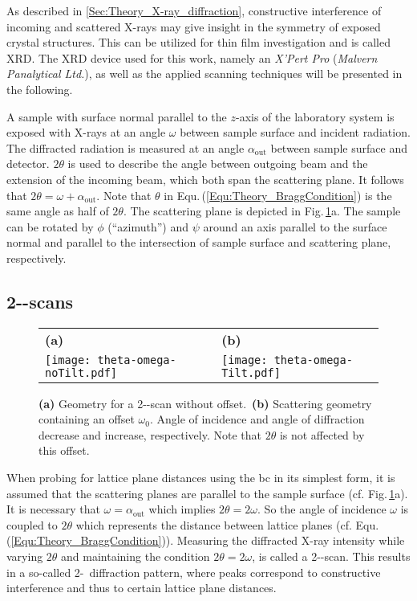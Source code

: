 As described in \ref{Sec:Theory_X-ray_diffraction}, constructive interference of incoming and scattered X-rays may give insight in the symmetry of exposed crystal structures.
This can be utilized for thin film investigation and is called \gls{XRD}.
The \gls{XRD} device used for this work, namely an \textit{X'Pert Pro} (\textit{Malvern Panalytical Ltd.}), as well as the applied scanning techniques will be presented in the following.

A sample with surface normal parallel to the $z$-axis of the laboratory system is exposed with X-rays at an angle $\omega$ between sample surface and incident radiation.
The diffracted radiation is measured at an angle $\alpha_\mathrm{out}$ between sample surface and detector.
$2\theta$ is used to describe the angle between outgoing beam and the extension of the incoming beam, which both span the scattering plane.
It follows that $2\theta=\omega+\alpha_\mathrm{out}$.
Note that $\theta$ in Equ.\,(\ref{Equ:Theory_BraggCondition}) is the same angle as half of $2\theta$.
The scattering plane is depicted in Fig.\,\ref{Fig:Methods_XRD_geometry}a.
The sample can be rotated by $\phi$ (\enquote{azimuth}) and $\psi$ around an axis parallel to the surface normal and parallel to the intersection of sample surface and scattering plane, respectively.

\subsection{2\texttheta-\textomega-scans}
    \label{Sec:Methods_2ThetaOmega}
\begin{figure}
    \centering
    \begin{tabular}{ll}
        \textbf{(a)}&\textbf{(b)}\\
        \texttt{[image: theta-omega-noTilt.pdf]}
        &\texttt{[image: theta-omega-Tilt.pdf]}
    \end{tabular}
    \caption{\textbf{(a)} Geometry for a 2\texttheta-\textomega-scan without offset.\ \textbf{(b)} Scattering geometry containing an offset $\omega_0$. Angle of incidence and angle of diffraction decrease and increase, respectively. Note that $2\theta$ is not affected by this offset.}
    \label{Fig:Methods_XRD_geometry}
\end{figure}
When probing for lattice plane distances using the \gls{bc} in its simplest form, it is assumed that the scattering planes are parallel to the sample surface (cf. Fig.\,\ref{Fig:Methods_XRD_geometry}a).
It is necessary that $\omega=\alpha_\mathrm{out}$ which implies $2\theta=2\omega$.
So the angle of incidence $\omega$ is coupled to $2\theta$ which represents the distance between lattice planes (cf. Equ.\,(\ref{Equ:Theory_BraggCondition})).
Measuring the diffracted X-ray intensity while varying $2\theta$ and maintaining the condition $2\theta=2\omega$, is called a 2\texttheta-\textomega-scan.
This results in a so-called 2\texttheta-\textomega\ diffraction pattern, where peaks correspond to constructive interference and thus to certain lattice plane distances.

